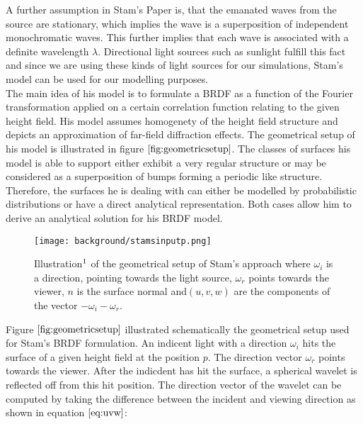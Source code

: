 A further assumption in Stam's Paper is, that the emanated waves from the source are stationary, which implies the wave is a superposition of independent monochromatic waves. This further implies that each wave is associated with a definite wavelength $\lambda$. Directional light sources such as sunlight fulfill this fact and since we are using these kinds of light sources for our simulations, Stam's model can be used for our modelling purposes. \\

The main idea of his model is to formulate a BRDF as a function of the Fourier transformation applied on a certain correlation function relating to the given height field. His model assumes homogenety of the height field structure and depicts an approximation of far-field diffraction effects. The geometrical setup of his model is illustrated in figure $\ref{fig:geometricsetup}$. The classes of surfaces his model is able to support either exhibit a very regular structure or may be considered as a superposition of bumps forming a periodic like structure. Therefore, the surfaces he is dealing with can either be modelled by probabilistic distributions or have a direct analytical representation. Both cases allow him to derive an analytical solution for his BRDF model.

\begin{figure}[H]
  \centering
  \texttt{[image: background/stamsinputp.png]}
  \caption[Stam's geometrical setup]{Illustration$\footnotemark$ of the geometrical setup of Stam's approach where $\omega_i$ is a direction, pointing towards the light source, $\omega_r$ points towards the viewer, $n$ is the surface normal and$ (u,v,w)$ are the components of the vector $-\omega_i - \omega_r$.}
  \label{fig:geometricsetup}  
\end{figure}

Figure $\ref{fig:geometricsetup}$ illustrated schematically the geometrical setup used for Stam's BRDF formulation. An indicent light with a direction $\omega_i$ hits the surface of a given height field at the position $p$. The direction vector $\omega_r$ points towards the viewer. After the indicdent has hit the surface, a spherical wavelet is reflected off from this hit position. The direction vector of the wavelet can be computed by taking the difference between the incident and viewing direction as shown in equation $\ref{eq:uvw}$:

